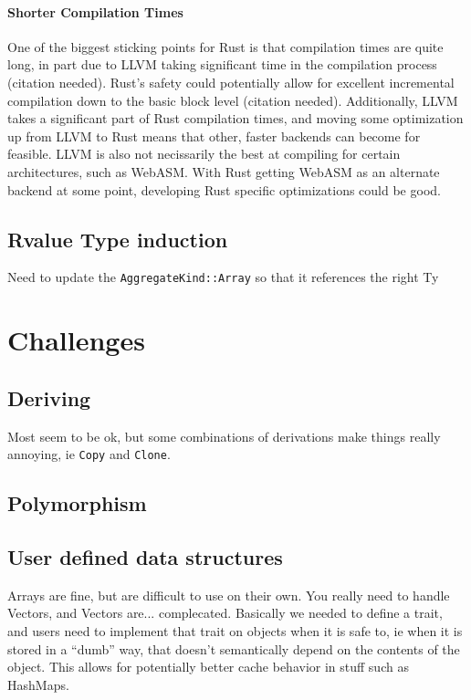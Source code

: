 \documentclass[12pt,final]{article}
\begin{document}
\paragraph{Shorter Compilation Times} One of the biggest sticking points for
Rust is that compilation times are quite long, in part due to LLVM taking
significant time in the compilation process (citation needed). Rust's safety
could potentially allow for excellent incremental compilation down to the basic
block level (citation needed). Additionally, LLVM takes a significant part of
Rust compilation times, and moving some optimization up from LLVM to Rust means
that other, faster backends can become for feasible. LLVM is also not
necissarily the best at compiling for certain architectures, such as WebASM.
With Rust getting WebASM as an alternate backend at some point, developing Rust
specific optimizations could be good.


\subsection{Rvalue Type induction}
Need to update the \texttt{AggregateKind::Array} so that it references the right Ty

\section{Challenges}
\label{sec:annoying}

\subsection{Deriving}
Most seem to be ok, but some combinations of derivations make things really
annoying, ie \texttt{Copy} and \texttt{Clone}.

\subsection{Polymorphism}

\subsection{User defined data structures}
Arrays are fine, but are difficult to use on their own. You really need to
handle Vectors, and Vectors are... complecated. Basically we needed to define a
trait, and users need to implement that trait on objects when it is safe to, ie
when it is stored in a ``dumb'' way, that doesn't semantically depend on the
contents of the object. This allows for potentially better cache behavior in
stuff such as HashMaps.
\end{document}
